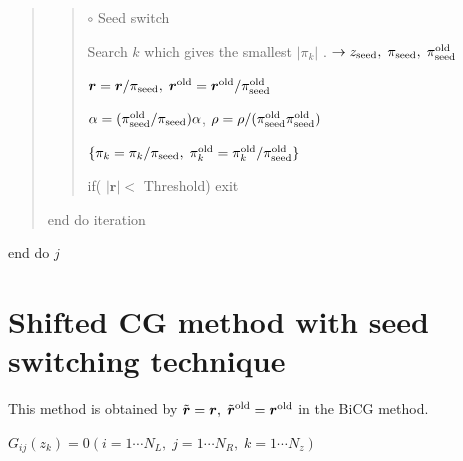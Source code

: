 \documentclass[letterpaper,10pt,dvipdfmx,openany]{sphinxmanual}
\begin{document}
\begin{quote}
\begin{quote}
\(\circ\) Seed switch

Search \(k\) which gives the smallest \(|\pi_k|\) . \(\rightarrow z_{\rm seed},\; \pi_{\rm seed},\; \pi_{\rm seed}^{\rm old}\)

\({\boldsymbol r} = {\boldsymbol r} / \pi_{\rm seed},\; {\boldsymbol r}^{\rm old} = {\boldsymbol r}^{\rm old} / \pi_{\rm seed}^{\rm old}\)

\(\alpha = (\pi_{\rm seed}^{\rm old} / \pi_{\rm seed}) \alpha\), \(\rho = \rho / (\pi_{\rm seed}^{\rm old} \pi_{\rm seed}^{\rm old})\)

\(\{\pi_k = \pi_k/\pi_{\rm seed},\; \pi_k^{\rm old} = \pi_k^{\rm old} / \pi_{\rm seed}^{\rm old}\}\)

if( \(|{\boldsymbol r}| <\) Threshold) exit
\end{quote}

end do iteration
\end{quote}

end do \(j\)


\section{Shifted CG method with seed switching technique}
\label{komega_algorithm_en:shifted-cg-method-with-seed-switching-technique}
This method is obtained by
\({\tilde {\boldsymbol r}} = {\boldsymbol r},\; {\tilde {\boldsymbol r}}^{\rm old} = {\boldsymbol r}^{\rm old}\)
in the BiCG method.

\(G_{i j}(z_k) = 0 (i=1 \cdots N_L,\; j = 1 \cdots N_R,\; k=1 \cdots N_z)\)
\end{document}
